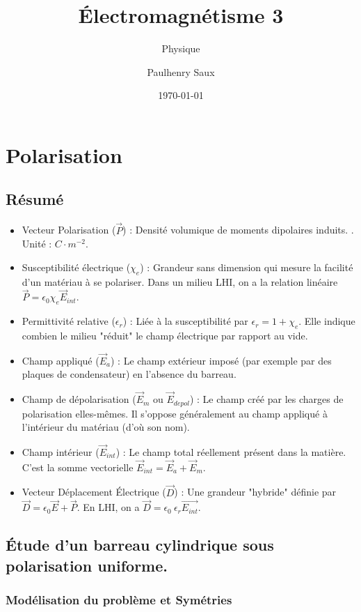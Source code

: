 \documentclass[french]{yLectureNote}
\title{Électromagnétisme 3}
\subtitle{Physique}
\author{Paulhenry Saux}
\date{\today}
\renewcommand{\vec}{\overrightarrow}
\begin{document}
\chapter{Polarisation}
\section{Résumé}

    \begin{itemize}
        \item Vecteur Polarisation ($\vec{P}$) : Densité volumique de moments dipolaires induits. . Unité : $C \cdot m^{-2}$.
\item Susceptibilité électrique ($\chi_e$) : Grandeur sans dimension qui mesure la facilité d'un matériau à se polariser. Dans un milieu LHI, on a la relation linéaire $\vec{P} = \epsilon_0 \chi_e \vec{E}_{int}$.
\item Permittivité relative ($\epsilon_r$) : Liée à la susceptibilité par $\epsilon_r = 1 + \chi_e$. Elle indique combien le milieu "réduit" le champ électrique par rapport au vide.
\item Champ appliqué ($\vec{E}_a$) : Le champ extérieur imposé (par exemple par des plaques de condensateur) en l'absence du barreau.
\item Champ de dépolarisation ($\vec{E}_{m}$ ou $\vec{E}_{depol}$) : Le champ créé par les charges de polarisation elles-mêmes. Il s'oppose généralement au champ appliqué à l'intérieur du matériau (d'où son nom).
\item Champ intérieur ($\vec{E}_{int}$) : Le champ total réellement présent dans la matière. C'est la somme vectorielle $\vec{E}_{int} = \vec{E}_a + \vec{E}_{m}$.
\item Vecteur Déplacement Électrique ($\vec{D}$) : Une grandeur "hybride" définie par $\vec{D} = \epsilon_0 \vec{E} + \vec{P}$.  En LHI, on a $\vec{D} = \epsilon_0\
\epsilon_r \vec{E_{int}}$.
    \end{itemize}


\section{Étude d'un barreau cylindrique sous polarisation uniforme.
}
\subsection{Modélisation du problème et Symétries}
\end{document}

